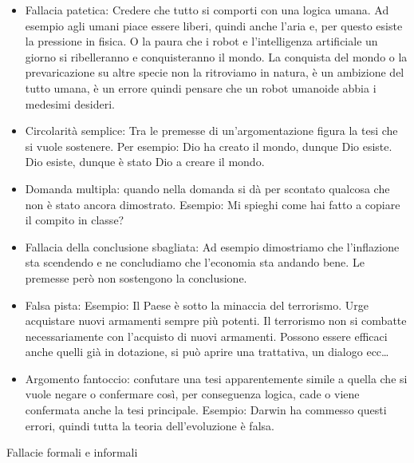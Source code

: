 \documentclass[12pt]{book} %
\begin{document}
\begin{itemize}
\item Fallacia patetica: Credere che tutto si comporti con una logica umana. Ad esempio agli umani piace essere liberi,
quindi anche l'aria e, per questo esiste la pressione in fisica. O la paura che i robot e
l'intelligenza artificiale un giorno si ribelleranno e conquisteranno il mondo. La conquista del
mondo o la prevaricazione su altre specie non la ritroviamo in natura, è un ambizione del tutto umana, è un errore
quindi pensare che un robot umanoide abbia i medesimi desideri.
\item Circolarità semplice: Tra le premesse di un'argomentazione figura la tesi che si vuole sostenere. Per esempio: Dio
ha creato il mondo, dunque Dio esiste. Dio esiste, dunque è stato Dio a creare il mondo.
\item Domanda multipla: quando nella domanda si dà per scontato qualcosa che non è stato ancora dimostrato. Esempio: Mi
spieghi come hai fatto a copiare il compito in classe?
\item Fallacia della conclusione sbagliata: Ad esempio dimostriamo che l'inflazione sta scendendo e
ne concludiamo che l'economia sta andando bene. Le premesse però non sostengono la conclusione.
\item Falsa pista: Esempio: Il Paese è sotto la minaccia del terrorismo. Urge acquistare nuovi armamenti sempre più
potenti. Il terrorismo non si combatte necessariamente con l'acquisto di nuovi armamenti. Possono essere efficaci anche
quelli già in dotazione, si può aprire una trattativa, un dialogo ecc…
\item Argomento fantoccio: confutare una tesi apparentemente simile a quella che si vuole negare o confermare così, per
conseguenza logica, cade o viene confermata anche la tesi principale. Esempio: Darwin ha commesso questi errori, quindi
tutta la teoria dell'evoluzione è falsa.
\end{itemize}

\bigskip

Fallacie formali e informali
\end{document}

